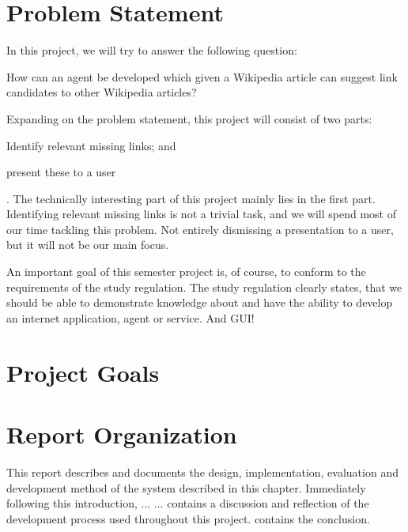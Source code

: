 \section{Problem Statement}
\label{sec:problem_statement}
In this project, we will try to answer the following question:

\begin{formal}
How can an agent be developed which given a Wikipedia article can suggest link candidates to other Wikipedia articles?
\end{formal}

Expanding on the problem statement, this project will consist of two parts:
\begin{enumerate*}[label=(\roman*)]
  \item Identify relevant missing links; and
  \item present these to a user
\end{enumerate*}. 
The technically interesting part of this project mainly lies in the first part. Identifying relevant missing links is not a trivial task, and we will spend most of our time tackling this problem. Not entirely dismissing a presentation to a user, but it will not be our main focus.

An important goal of this semester project is, of course, to conform to the requirements of the study regulation. The study regulation clearly states, that we should be able to demonstrate knowledge about and have the ability to develop an internet application, agent or service. And GUI! 


\section{Project Goals}

\section{Report Organization}
This report describes and documents the design, implementation, evaluation and development method of the system described in this chapter. Immediately following this introduction,  ... \dummy ...  contains a discussion and reflection of the development process used throughout this project.  contains the conclusion.
